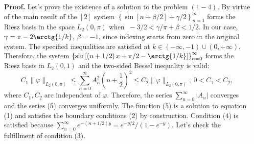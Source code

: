 \documentclass[11pt,twoside]{article}
\begin{document}
	\par	
	\textbf{Proof.} Let's prove the existence of a solution to the problem $(1 - 4)$. By virtue of the main result of the $[2]$ system 
	$\left\{ \sin{\left[n + \beta/2\right] + \gamma/2}\right\}_{n=1}^{\infty}$
	forms the Riesz basis in the space $L_2(0, \pi)$ when $\ -3/2 < \gamma / \pi + \beta <  1/2$. In our case, $\gamma = \pi - 2 \arctg{1/k}$, $\beta = -1$, since indexing starts from zero in the original system. The specified inequalities are satisfied at $k\in(-\infty, -1)\cup (0, +\infty)$. Therefore, the system $\left\{\sin{\left[\left(n +1/2\right)x+ \pi/2 - \arctg{1/k}\right]}\right\}_{n=0}^{\infty}$ forms the Riesz basis in $L_2(0,1)$ and the two-sided Bessel inequality is valid:
	\begin{equation*}
		C_1 \|\varphi \|_{L_2(0,\pi)} \leq \sum\limits_{n=0}^{\infty} A_n^2 \left(n + \dfrac12\right)^2 \leq C_2 \|\varphi \|_{L_2(0,\pi)} ,\ 0 < C_1 < C_2, 
	\end{equation*}
	where $C_1, C_2$ are independent of $\varphi$. Therefore, the series $\sum\limits_{n=0}^{\infty}|A_n|$ converges and the series (5) converges uniformly. The function (5) is a solution to equation (1) and satisfies the boundary conditions (2) by construction. Condition (4) is satisfied because $\sum\limits_{n=0}^{\infty} e^{-\left(n + 1/2\right)y} = e^{-y/2} / (1 - e^{-y})$. Let's check the fulfillment of condition (3).\newline
	
\end{document}
